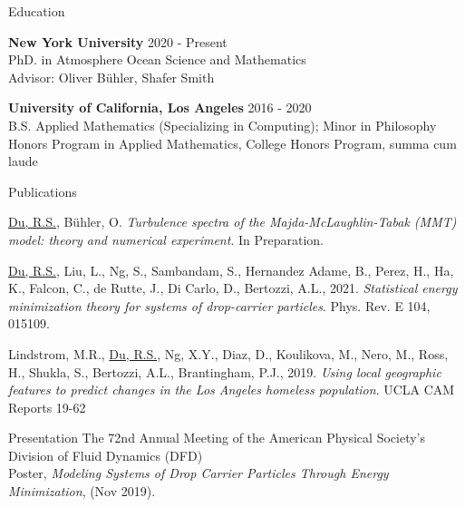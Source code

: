\documentclass{resume} %
\begin{document}

\begin{rSection}{Education}

{\bf New York University} \hfill {2020 - Present} \\
PhD. in Atmosphere Ocean Science and Mathematics\\
Advisor: Oliver B\"uhler, Shafer Smith

{\bf University of California, Los Angeles} \hfill {2016 - 2020} \\
B.S. Applied Mathematics (Specializing in Computing); Minor in Philosophy\\
Honors Program in Applied Mathematics, College Honors Program, summa cum laude

\end{rSection}


\begin{rSection}{Publications}
\begin{etaremune}
    \item \underline{Du, R.S.}, B\"uhler, O. \textit{Turbulence spectra of the Majda-McLaughlin-Tabak (MMT) model: theory and numerical experiment}. In Preparation.
    \item \underline{Du, R.S.}, Liu, L., Ng, S., Sambandam, S., Hernandez Adame, B., Perez, H., Ha, K., Falcon, C., de Rutte, J., Di Carlo, D., Bertozzi, A.L., 2021. \textit{Statistical energy minimization theory for systems of drop-carrier particles}. Phys. Rev. E 104, 015109.
    \item Lindstrom, M.R., \underline{Du, R.S.}, Ng, X.Y., Diaz, D., Koulikova, M., Nero, M., Ross, H., Shukla, S., Bertozzi, A.L., Brantingham, P.J., 2019. \textit{Using local geographic features to predict changes in the Los Angeles homeless population}. UCLA CAM Reports 19-62
\end{etaremune}
\end{rSection}


\begin{rSection}{Presentation}
The 72nd Annual Meeting of the American Physical Society's Division of Fluid Dynamics (DFD)\\
Poster, \textit{Modeling Systems of Drop Carrier Particles Through Energy Minimization},  (Nov 2019).
\end{rSection}
\end{document}
